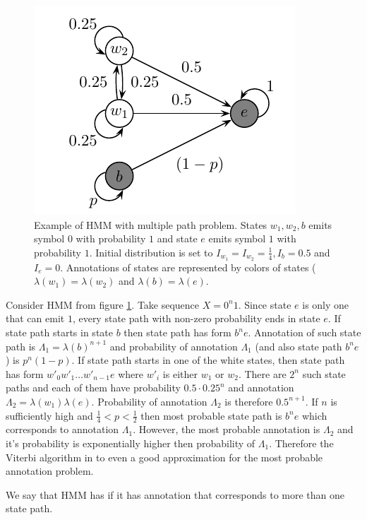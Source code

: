 \begin{figure}
\begin{center}
\includegraphics{../figures/multiplePathProblemHMM.pdf}
\end{center}
\caption[Hidden Markov Model with multiple path problem.]{Example of HMM with
multiple path problem. States $w_1,w_2,b$ emits symbol $0$ with probability $1$
and state $e$ emits symbol $1$ with probability $1$. Initial distribution is set
to $I_{w_1}=I_{w_2}=\frac14, I_{b}=0.5$
and $I_e=0$. Annotations of states are represented by colors of states
($\lambda(w_1)=\lambda(w_2)$ and $\lambda(b)=\lambda(e)$. }\label{FIGURE:BADVITERBIEXAMPLE}
\end{figure}

\begin{example}
Consider HMM from figure \ref{FIGURE:BADVITERBIEXAMPLE}. Take sequence $X=0^n1$.
Since state $e$ is only one that can emit $1$, every state path with non-zero
probability ends in state $e$. If state path starts in state $b$ then state
path has form $b^ne$. Annotation of such state path is $\Lambda_1=\lambda(b)^{n+1}$
and probability of annotation $\Lambda_1$ (and also state path $b^ne$) is $p^n(1-p)$.
If state path starts in one of the white states, then state path
has form $w'_0w'_1\dots w'_{n-1}e$ where $w'_i$ is either $w_1$ or $w_2$.
There are $2^n$ such state paths and each of them have probability $0.5\cdot
0.25^n$ and annotation $\Lambda_2=\lambda(w_1)\lambda(e)$. Probability of
annotation $\Lambda_2$ is therefore $0.5^{n+1}$.
If $n$ is sufficiently high and $\frac14<p<\frac12$ then most probable state
path is $b^ne$ which corresponds to annotation $\Lambda_1$. However, the most
probable annotation is $\Lambda_2$ and it's probability is exponentially higher
then probability of $\Lambda_1$. Therefore the Viterbi algorithm in to even a
good approximation for the most probable annotation problem.

We say that HMM has  if it has annotation that
corresponds to more than one state path.
\end{example}



